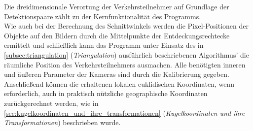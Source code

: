 Die dreidimensionale Verortung der Verkehrsteilnehmer auf Grundlage der Detektionspaare zählt zu der Kernfunktionalität des Programms.\\
Wie auch bei der Berechnung des Schnittwinkels werden die Pixel-Positionen der Objekte auf den Bildern durch die Mittelpunkte der Entdeckungsrechtecke ermittelt und schließlich kann das Programm unter Einsatz des in \ref{subsec:triangulation} (\emph{Triangulation}) ausführlich beschriebenen  Algorithmus' die räumliche Position des Verkehrsteilnehmers ausmachen. Alle benötigten inneren und äußeren Parameter der Kameras sind durch die Kalibrierung gegeben.\\
Anschließend können die erhaltenen lokalen euklidischen Koordinaten, wenn erforderlich, auch in praktisch nützliche geographische Koordinaten zurückgerechnet werden, wie in \ref{sec:kugelkoordinaten_und_ihre_transformationen} (\emph{Kugelkoordinaten und ihre Transformationen}) beschrieben wurde.
